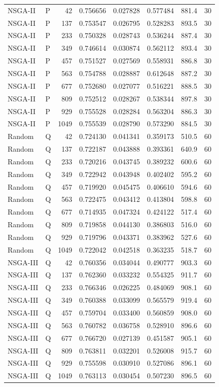 \begin{longtable}{llrrrrrr}
NSGA-II & P & 42 & 0.756656 & 0.027828 & 0.577484 & 881.4 & 30 \\
NSGA-II & P & 137 & 0.753547 & 0.026795 & 0.528283 & 893.5 & 30 \\
NSGA-II & P & 233 & 0.750328 & 0.028743 & 0.536244 & 887.4 & 30 \\
NSGA-II & P & 349 & 0.746614 & 0.030874 & 0.562112 & 893.4 & 30 \\
NSGA-II & P & 457 & 0.751527 & 0.027569 & 0.558931 & 886.8 & 30 \\
NSGA-II & P & 563 & 0.754788 & 0.028887 & 0.612648 & 887.2 & 30 \\
NSGA-II & P & 677 & 0.752680 & 0.027077 & 0.516221 & 888.5 & 30 \\
NSGA-II & P & 809 & 0.752512 & 0.028267 & 0.538344 & 897.8 & 30 \\
NSGA-II & P & 929 & 0.755528 & 0.028284 & 0.563204 & 886.3 & 30 \\
NSGA-II & P & 1049 & 0.755539 & 0.028790 & 0.573290 & 884.5 & 30 \\
Random & Q & 42 & 0.724130 & 0.041341 & 0.359173 & 510.5 & 60 \\
Random & Q & 137 & 0.722187 & 0.043888 & 0.393361 & 640.9 & 60 \\
Random & Q & 233 & 0.720216 & 0.043745 & 0.389232 & 600.6 & 60 \\
Random & Q & 349 & 0.722942 & 0.043948 & 0.402402 & 595.2 & 60 \\
Random & Q & 457 & 0.719920 & 0.045475 & 0.406610 & 594.6 & 60 \\
Random & Q & 563 & 0.722475 & 0.043412 & 0.413804 & 598.8 & 60 \\
Random & Q & 677 & 0.714935 & 0.047324 & 0.424122 & 517.4 & 60 \\
Random & Q & 809 & 0.719858 & 0.044130 & 0.386803 & 516.0 & 60 \\
Random & Q & 929 & 0.719796 & 0.043371 & 0.383962 & 527.6 & 60 \\
Random & Q & 1049 & 0.722042 & 0.042518 & 0.363235 & 518.7 & 60 \\
NSGA-III & Q & 42 & 0.760356 & 0.034044 & 0.490777 & 903.3 & 60 \\
NSGA-III & Q & 137 & 0.762360 & 0.033232 & 0.554325 & 911.7 & 60 \\
NSGA-III & Q & 233 & 0.766346 & 0.026225 & 0.484069 & 908.1 & 60 \\
NSGA-III & Q & 349 & 0.760388 & 0.033099 & 0.565579 & 919.4 & 60 \\
NSGA-III & Q & 457 & 0.759704 & 0.033400 & 0.560859 & 908.0 & 60 \\
NSGA-III & Q & 563 & 0.760782 & 0.036758 & 0.528910 & 896.6 & 60 \\
NSGA-III & Q & 677 & 0.766720 & 0.027139 & 0.451587 & 905.1 & 60 \\
NSGA-III & Q & 809 & 0.763811 & 0.032201 & 0.526008 & 915.7 & 60 \\
NSGA-III & Q & 929 & 0.755598 & 0.030910 & 0.527086 & 896.1 & 60 \\
NSGA-III & Q & 1049 & 0.763113 & 0.030454 & 0.507230 & 896.5 & 60 \\
\bottomrule
\end{longtable}
